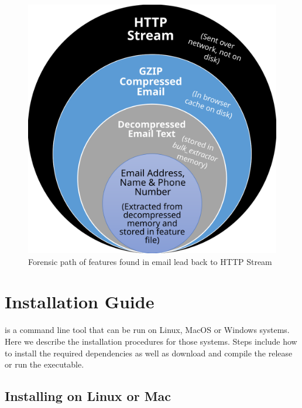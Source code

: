 \documentclass[11pt,fleqn]{article} %
\begin{document}
\begin{figure}
	\center
	\includegraphics[scale=.55]{drawings/forensic_path}
	\caption{Forensic path of features found in email lead back to HTTP Stream}
	\label{fig:forensicPath}
\end{figure}



\section{Installation Guide}
\hash is a command line tool that can be run on Linux, MacOS or Windows systems. Here we describe the installation procedures for those systems.
Steps include how to install the required dependencies as well as download \hash and compile the release or run the executable. 
\label{Installation}

\subsection{Installing on Linux or Mac}
\end{document}
